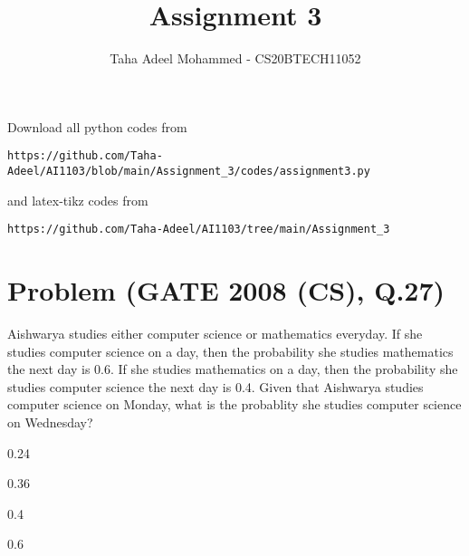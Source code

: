\documentclass[journal,12pt,twocolumn]{IEEEtran}
\begin{document}
     \def\rightbox#1{\makebox[0in][r]{#1}}
     \def\centbox#1{\makebox[0in]{#1}}
     \def\topbox#1{\raisebox{-\baselineskip}[0in][0in]{#1}}
     \def\midbox#1{\raisebox{-0.5\baselineskip}[0in][0in]{#1}}
\vspace{3cm}
\title{Assignment 3}
\author{Taha Adeel Mohammed - CS20BTECH11052}
\maketitle
\newpage
\bigskip
\renewcommand{\thefigure}{\theenumi}
\renewcommand{\thetable}{\theenumi}
Download all python codes from 
\begin{lstlisting}
https://github.com/Taha-Adeel/AI1103/blob/main/Assignment_3/codes/assignment3.py
\end{lstlisting}
%
and latex-tikz codes from 
%
\begin{lstlisting}
https://github.com/Taha-Adeel/AI1103/tree/main/Assignment_3
\end{lstlisting}
\vspace{-3mm}
\section{Problem (GATE 2008 (CS), Q.27)}
Aishwarya studies either computer science or mathematics everyday. If she studies computer science on a day, then the probability she studies mathematics the next day is 0.6. If she studies mathematics on a day, then the probability she studies computer science the next day is 0.4.
Given that Aishwarya studies computer science on Monday, what is the probablity she studies computer science on Wednesday?
\begin{enumerate}[label=(\Alph*)]
\begin{multicols}{2}
\item 0.24
\item 0.36
\item 0.4
\item 0.6
\end{multicols}
\end{enumerate}
\end{document}
